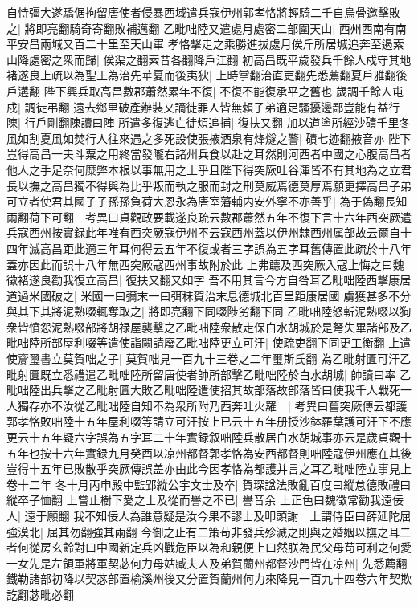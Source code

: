 自恃彊大遂驕倨拘留唐使者侵暴西域遣兵寇伊州郭孝恪將輕騎二千自烏骨邀擊敗之|{
	將即亮翻騎奇寄翻敗補邁翻}
乙毗咄陸又遣處月處密二部圍天山|{
	西州西南有南平安昌兩城又百二十里至天山軍}
孝恪擊走之乘勝進拔處月俟斤所居城追奔至遏索山降處密之衆而歸|{
	俟渠之翻索昔各翻降戶江翻}
初高昌既平歲發兵千餘人戍守其地褚遂良上疏以為聖王為治先華夏而後夷狄|{
	上時掌翻治直吏翻先悉薦翻夏戶雅翻後戶遘翻}
陛下興兵取高昌數郡蕭然累年不復|{
	不復不能復承平之舊也}
歲調千餘人屯戍|{
	調徒弔翻}
遠去鄉里破產辦裝又謫徙罪人皆無賴子弟適足騷擾邊鄙豈能有益行陳|{
	行戶剛翻陳讀曰陣}
所遣多復逃亡徒煩追捕|{
	復扶又翻}
加以道塗所經沙磧千里冬風如割夏風如焚行人往來遇之多死設使張掖酒泉有烽燧之警|{
	磧七迹翻掖音亦}
陛下豈得高昌一夫斗粟之用終當發隴右諸州兵食以赴之耳然則河西者中國之心腹高昌者他人之手足奈何糜弊本根以事無用之土乎且陛下得突厥吐谷渾皆不有其地為之立君長以撫之高昌獨不得與為比乎叛而執之服而封之刑莫威焉德莫厚焉願更擇高昌子弟可立者使君其國子子孫孫負荷大恩永為唐室藩輔内安外寧不亦善乎|{
	為于偽翻長知兩翻荷下可翻　考異曰貞觀政要載遂良疏云數郡蕭然五年不復下言十六年西突厥遣兵寇西州按實録此年唯有西突厥寇伊州不云寇西州蓋以伊州隸西州属部故云爾自十四年滅高昌距此適三年耳何得云五年不復或者三字誤為五字耳舊傳置此疏於十八年蓋亦因此而誤十八年無西突厥寇西州事故附於此}
上弗聼及西突厥入寇上悔之曰魏徵褚遂良勸我復立高昌|{
	復扶又翻又如字}
吾不用其言今方自咎耳乙毗咄陸西擊康居道過米國破之|{
	米國一曰彌末一曰弭秣賀治末息德城北百里距康居國}
虜獲甚多不分與其下其將泥熟啜輒奪取之|{
	將即亮翻下同啜陟劣翻下同}
乙毗咄陸怒斬泥熟啜以狥衆皆憤怨泥熟啜部將胡禄屋襲擊之乙毗咄陸衆散走保白水胡城於是弩失畢諸部及乙毗咄陸所部屋利啜等遣使詣闕請廢乙毗咄陸更立可汗|{
	使疏吏翻下同更工衡翻}
上遣使齎璽書立莫賀咄之子|{
	莫賀咄見一百九十三卷之二年璽斯氏翻}
為乙毗射匱可汗乙毗射匱既立悉禮遣乙毗咄陸所留唐使者帥所部擊乙毗咄陸於白水胡城|{
	帥讀曰率}
乙毗咄陸出兵擊之乙毗射匱大敗乙毗咄陸遣使招其故部落故部落皆曰使我千人戰死一人獨存亦不汝從乙毗咄陸自知不為衆所附乃西奔吐火羅　|{
	考異曰舊突厥傳云都護郭孝恪敗咄陸十五年屋利啜等請立可汗按上已云十五年册授沙鉢羅葉護可汗下不應更云十五年疑六字誤為五字耳二十年實録叙咄陸兵散居白水胡城事亦云是歲貞觀十五年也按十六年實録九月癸酉以凉州都督郭孝恪為安西都督則咄陸寇伊州應在其後豈得十五年已敗散乎突厥傳誤盖亦由此今因孝恪為都護并言之耳乙毗咄陸立事見上卷十二年}
冬十月丙申殿中監郢縱公宇文士及卒|{
	賀琛諡法敗亂百度曰縱怠德敗禮曰縱卒子恤翻}
上嘗止樹下愛之士及從而譽之不已|{
	譽音余}
上正色曰魏徵常勸我遠佞人|{
	遠于願翻}
我不知佞人為誰意疑是汝今果不謬士及叩頭謝　上謂侍臣曰薛延陀屈強漠北|{
	屈其勿翻強其兩翻}
今御之止有二策苟非發兵殄滅之則與之婚姻以撫之耳二者何從房玄齡對曰中國新定兵凶戰危臣以為和親便上曰然朕為民父母苟可利之何愛一女先是左領軍將軍契苾何力母姑臧夫人及弟賀蘭州都督沙門皆在凉州|{
	先悉薦翻鐵勒諸部初降以契苾部置榆溪州後又分置賀蘭州何力來降見一百九十四卷六年契欺訖翻苾毗必翻}
